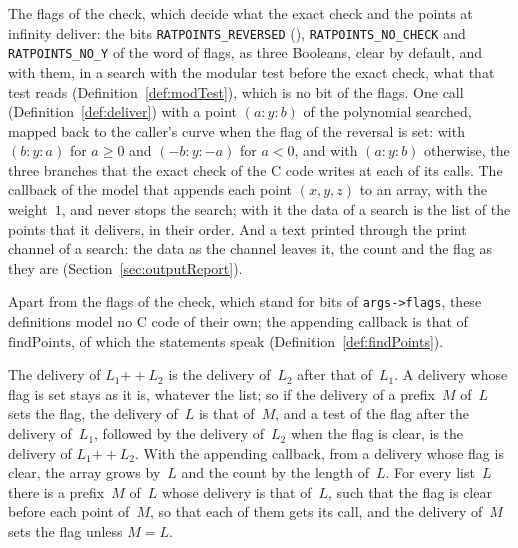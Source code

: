 \begin{definition}\label{def:callback}
  \leanok
  The flags of the check, which decide what the exact check and the points at infinity deliver: the
  bits \verb|RATPOINTS_REVERSED| (), \verb|RATPOINTS_NO_CHECK| and
  \verb|RATPOINTS_NO_Y| of the word of flags, as three Booleans, clear by default, and with them, in
  a search with the modular test before the exact check, what that test reads
  (Definition~\ref{def:modTest}), which is no bit of the flags. One call
  (Definition~\ref{def:deliver}) with a point $(a : y : b)$ of the polynomial searched, mapped back
  to the caller's curve when the flag of the reversal is set: with $(b : y : a)$ for $a \ge 0$ and
  $(-b : y : -a)$ for $a < 0$, and with $(a : y : b)$ otherwise, the three branches that the exact
  check of the C code writes at each of its calls. The callback of the model that appends each point
  $(x, y, z)$ to an array, with the weight~$1$, and never stops the search; with it the data of a
  search is the list of the points that it delivers, in their order. And a text printed through the
  print channel of a search: the data as the channel leaves it, the count and the flag as they are
  (Section~\ref{sec:outputReport}).
\end{definition}

Apart from the flags of the check, which stand for bits of \verb|args->flags|, these definitions
model no C code of their own; the appending callback is that of $\mathrm{findPoints}$, of which the
statements speak (Definition~\ref{def:findPoints}).

\begin{lemma}\label{lem:deliverList}
  \leanok
  The delivery of $L_1 \mathbin{+\!\!+} L_2$ is the delivery of~$L_2$ after that of~$L_1$. A
  delivery whose flag is set stays as it is, whatever the list; so if the delivery of a
  prefix~$M$ of~$L$ sets the flag, the delivery of~$L$ is that of~$M$, and a test of the flag after
  the delivery of~$L_1$, followed by the delivery of~$L_2$ when the flag is clear, is the delivery
  of $L_1 \mathbin{+\!\!+} L_2$. With the appending callback, from a delivery whose flag is clear,
  the array grows by~$L$ and the count by the length of~$L$. For every list~$L$ there is a
  prefix~$M$ of~$L$ whose delivery is that of~$L$, such that the flag is clear before each point
  of~$M$, so that each of them gets its call, and the delivery of~$M$ sets the flag unless $M = L$.
\end{lemma}

